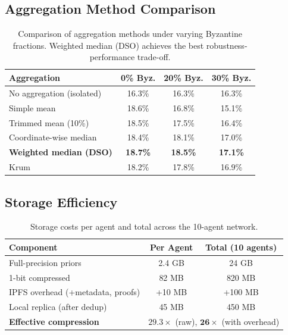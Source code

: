 \subsection{Aggregation Method Comparison}

\begin{table}[h]
\centering
\begin{tabular}{lccc}
\toprule
Aggregation & 0\% Byz. & 20\% Byz. & 30\% Byz. \\
\midrule
No aggregation (isolated) & 16.3\% & 16.3\% & 16.3\% \\
Simple mean & 18.6\% & 16.8\% & 15.1\% \\
Trimmed mean (10\%) & 18.5\% & 17.5\% & 16.4\% \\
Coordinate-wise median & 18.4\% & 18.1\% & 17.0\% \\
\textbf{Weighted median (DSO)} & \textbf{18.7\%} & \textbf{18.5\%} & \textbf{17.1\%} \\
Krum~\cite{blanchard2017machine} & 18.2\% & 17.8\% & 16.9\% \\
\bottomrule
\end{tabular}
\caption{Comparison of aggregation methods under varying Byzantine fractions.
Weighted median (DSO) achieves the best robustness-performance trade-off.}
\label{tab:aggregation-comparison}
\end{table}

\subsection{Storage Efficiency}

\begin{table}[h]
\centering
\begin{tabular}{lcc}
\toprule
Component & Per Agent & Total (10 agents) \\
\midrule
Full-precision priors & 2.4 GB & 24 GB \\
1-bit compressed & 82 MB & 820 MB \\
IPFS overhead (+metadata, proofs) & +10 MB & +100 MB \\
Local replica (after dedup) & 45 MB & 450 MB \\
\midrule
\textbf{Effective compression} & \multicolumn{2}{c}{$\mathbf{29.3\times}$ (raw), $\mathbf{26\times}$ (with overhead)} \\
\bottomrule
\end{tabular}
\caption{Storage costs per agent and total across the 10-agent network.}
\label{tab:storage}
\end{table}

